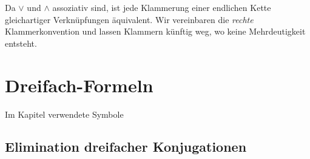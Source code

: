 \documentclass[main.tex]{subfiles}
\begin{document}
\begin{tabproofsplit}
  \proofpart{$\vdash$}
  \closeproofpart

  \proofpart{$\dashv$}
  \closeproofpart
\end{tabproofsplit}

\begin{remark}
Da \(\lor\) und \(\land\) assoziativ sind, ist jede Klammerung einer endlichen Kette
gleichartiger Verknüpfungen äquivalent. Wir vereinbaren die \emph{rechte}
Klammerkonvention und lassen Klammern künftig weg, wo keine Mehrdeutigkeit entsteht.
\end{remark}


\section{Dreifach-Formeln}
\begin{DeltaContext}{Im Kapitel verwendete Symbole}
\end{DeltaContext}

\subsection{Elimination dreifacher Konjugationen}

\begin{tabproof}
\end{tabproof}
\end{document}
